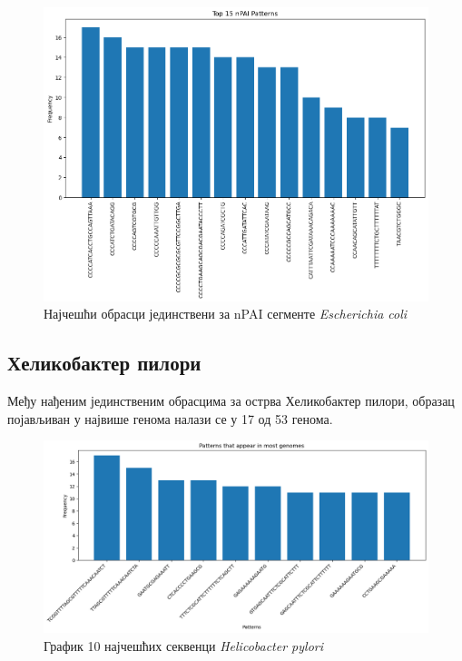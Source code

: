 \documentclass[12pt]{article}
\begin{document}
\begin{figure}[htbp]
    \centering
    \includegraphics[width=0.8\linewidth]{images/e_coli/top15_npai.png}
    \caption{Најчешћи обрасци јединствени за nPAI сегменте \textit{Escherichia coli}}
    \label{fig:top15_npai}
\end{figure}

\clearpage

\subsection{Хеликобактер пилори}

Међу нађеним јединственим обрасцима за острва Хеликобактер пилори, образац појављиван у највише генома налази се у 17 од 53 генома.

\begin{figure}[htbp]
    \centering
    \vspace{0.2cm}
    \includegraphics[width=\linewidth]{images/h_pylori/top_10_hist.png}
    \caption{График 10 најчешћих секвенци \textit{Helicobacter pylori}}
    \label{fig:top10histhpylori}
    \vspace{0.5cm}
\end{figure}
\end{document}
